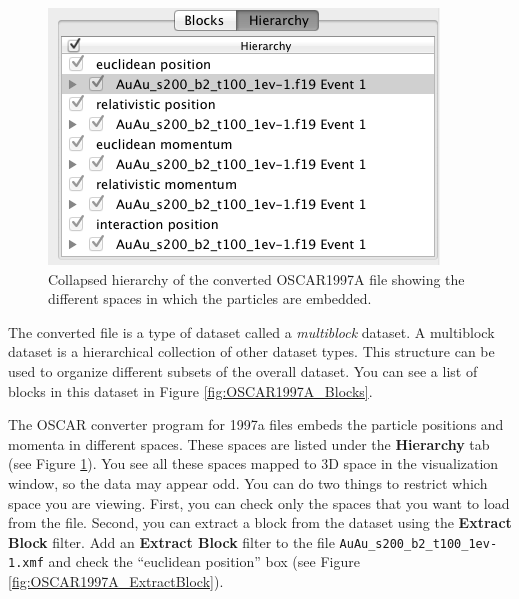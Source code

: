 \documentclass[12pt]{article}
\newcommand{\filter}[1]{\textbf{#1}}
\newcommand{\file}[1]{\texttt{#1}}
\newcommand{\setting}[1]{\textbf{#1}}
\begin{document}
\begin{figure}[htbp]
   \centering
   \includegraphics[scale=.5]{images/OSCAR1997A_HierarchyCollapsed.png} %
   \caption{Collapsed hierarchy of the converted OSCAR1997A file showing the different spaces in which the particles are embedded.}
   \label{fig:OSCAR1997A_HierarchyCollapsed}
\end{figure}

The converted file is a type of dataset called a \emph{multiblock} dataset. A multiblock dataset is a hierarchical collection of other dataset types. This structure can be used to organize different subsets of the overall dataset. You can see a list of blocks in this dataset in Figure \ref{fig:OSCAR1997A_Blocks}.

The OSCAR converter program for 1997a files embeds the particle positions and momenta in different spaces. These spaces are listed under the \setting{Hierarchy} tab (see Figure \ref{fig:OSCAR1997A_HierarchyCollapsed}). You see all these spaces mapped to 3D space in the visualization window, so the data may appear odd. You can do two things to restrict which space you are viewing. First, you can check only the spaces that you want to load from the file. Second, you can extract a block from the dataset using the \filter{Extract Block} filter. Add an \filter{Extract Block} filter to the file \file{AuAu\_s200\_b2\_t100\_1ev-1.xmf} and check the ``euclidean position'' box (see Figure \ref{fig:OSCAR1997A_ExtractBlock}).
\end{document}
